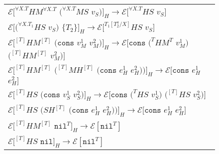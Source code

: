 \begin{figure}[ph!]
\begin{tabular}{l}
\vspace{5pt}

$\mathscr{E}[^{\forall X.T}HM^{\forall X.T}$ $(^{\forall X.T}MS$ $v_{S})]_{H}\rightarrow\mathscr{E}[^{\forall X.T}HS$ $v_{S}]$ \\

\vspace{5pt}

$\mathscr{E}[(^{\forall X.T_{1}}HS$ $v_{S})$ $\lbrace T_{2}\rbrace]_{H}\rightarrow\mathscr{E}[^{T_{1}[T^{a}_{2}/X]}HS$ $v_{S}]$ \\

\vspace{5pt}

$\mathscr{E}[^{[T]}HM^{[T]}$ $(\mathtt{cons}$ $v_{M}^{1}$ $v_{M}^{2})]_{H}\rightarrow\mathscr{E}[\mathtt{cons}$ $(^{T}HM^{T}$ $v_{M}^{1})$ $(^{[T]}HM^{[T]}$ $v_{M}^{2})]$ \\

\vspace{5pt}

$\mathscr{E}[^{[T]}HM^{[T]}$ $(^{[T]}MH^{[T]}$ $(\mathtt{cons}$ $e_{H}^{1}$ $e_{H}^{2}))]_{H}\rightarrow\mathscr{E}[\mathtt{cons}$ $e_{H}^{1}$ $e_{H}^{2}]$ \\

\vspace{5pt}

$\mathscr{E}[^{[T]}HS$ $(\mathtt{cons}$ $v_{S}^{1}$ $v_{S}^{2})]_{H}\rightarrow\mathscr{E}[\mathtt{cons}$ $(^{T}HS$ $v_{S}^{1})$ $(^{[T]}HS$ $v_{S}^{2})]$ \\

\vspace{5pt}

$\mathscr{E}[^{[T]}HS$ $(SH^{[T]}$ $(\mathtt{cons}$ $e_{H}^{1}$ $e_{H}^{2}))]_{H}\rightarrow\mathscr{E}[\mathtt{cons}$ $e_{H}^{1}$ $e_{H}^{2}]$ \\

\vspace{5pt}

$\mathscr{E}[^{[T]}HM^{[T]}$ $\mathtt{nil}^{T}]_{H}\rightarrow\mathscr{E}[\mathtt{nil}^{T}]$ \\

\vspace{5pt}

$\mathscr{E}[^{[T]}HS$ $\mathtt{nil}]_{H}\rightarrow\mathscr{E}[\mathtt{nil}^{T}]$ \\


\end{tabular}
\end{figure}
